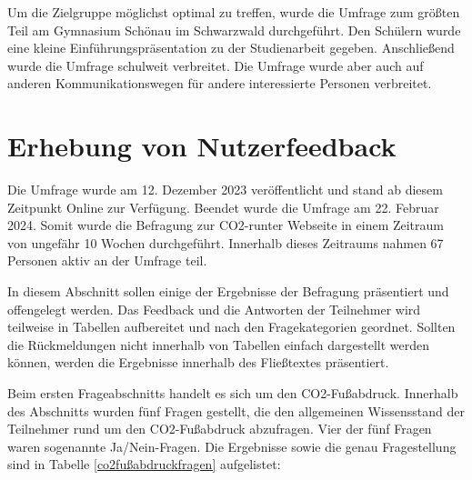 Um die Zielgruppe möglichst optimal zu treffen, wurde die Umfrage zum größten Teil am Gymnasium Schönau im Schwarzwald durchgeführt.
Den Schülern wurde eine kleine Einführungspräsentation zu der Studienarbeit gegeben.
Anschließend wurde die Umfrage schulweit verbreitet.
Die Umfrage wurde aber auch auf anderen Kommunikationswegen für andere interessierte Personen verbreitet.

\section{Erhebung von Nutzerfeedback}
Die Umfrage wurde am 12. Dezember 2023 veröffentlicht und stand ab diesem Zeitpunkt Online zur Verfügung.
Beendet wurde die Umfrage am 22. Februar 2024.
Somit wurde die Befragung zur CO2-runter Webseite in einem Zeitraum von ungefähr 10 Wochen durchgeführt.
Innerhalb dieses Zeitraums nahmen 67 Personen aktiv an der Umfrage teil.

In diesem Abschnitt sollen einige der Ergebnisse der Befragung präsentiert und offengelegt werden.
Das Feedback und die Antworten der Teilnehmer wird teilweise in Tabellen aufbereitet und nach den Fragekategorien geordnet.
Sollten die Rückmeldungen nicht innerhalb von Tabellen einfach dargestellt werden können, werden die Ergebnisse innerhalb des Fließtextes präsentiert.

Beim ersten Frageabschnitts handelt es sich um den CO2-Fußabdruck.
Innerhalb des Abschnitts wurden fünf Fragen gestellt, die den allgemeinen Wissensstand der Teilnehmer rund um den CO2-Fußabdruck abzufragen.
Vier der fünf Fragen waren sogenannte Ja/Nein-Fragen.
Die Ergebnisse sowie die genau Fragestellung sind in Tabelle \ref{co2fußabdruckfragen} aufgelistet: \newline

